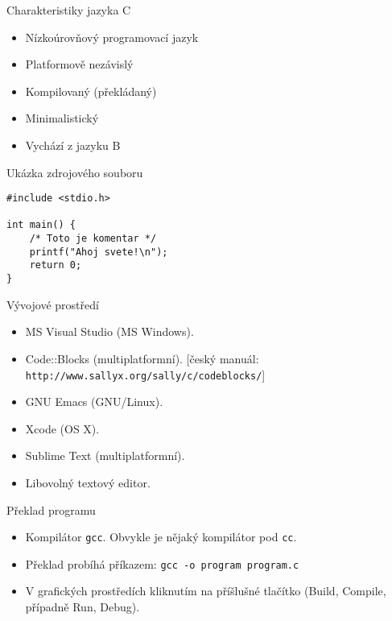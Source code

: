 \documentclass{beamer}
\newenvironment{itemizex}%
  {\large \begin{itemize}%
    \setlength{\itemsep}{8pt}%
    \setlength{\parskip}{8pt}}%
  {\end{itemize}}
\begin{document}
\begin{frame}[t,fragile]{Charakteristiky jazyka C}
\begin{itemizex}
    \item Nízkoúrovňový programovací jazyk
    \item Platformově nezávislý
    \item Kompilovaný (překládaný)
    \item Minimalistický
    \item Vychází z jazyku B
  \end{itemizex}
\end{frame}

\begin{frame}[t,fragile]{Ukázka zdrojového souboru}
\begin{verbatim} 
#include <stdio.h>

int main() {
    /* Toto je komentar */
    printf("Ahoj svete!\n");
    return 0; 
}
\end{verbatim} 
\end{frame}


\begin{frame}[t,fragile]{Vývojové prostředí}
\begin{itemizex}
  \item MS Visual Studio (MS Windows).
  \item Code::Blocks (multiplatformní). [český manuál: \texttt{http://www.sallyx.org/sally/c/codeblocks/}]
  \item GNU Emacs (GNU/Linux).
  \item Xcode (OS X).
  \item Sublime Text (multiplatformní).
  \item Libovolný textový editor.
\end{itemizex}
\end{frame}

\begin{frame}[t,fragile]{Překlad programu}
\begin{itemizex}
  \item Kompilátor \texttt{gcc}. Obvykle je nějaký kompilátor pod \texttt{cc}.
  \item Překlad probíhá příkazem: \texttt{gcc -o program program.c}
  \item V grafických prostředích kliknutím na příšlušné tlačítko (Build, Compile, případně Run, Debug).
\end{itemizex}
\end{frame}
\end{document}
